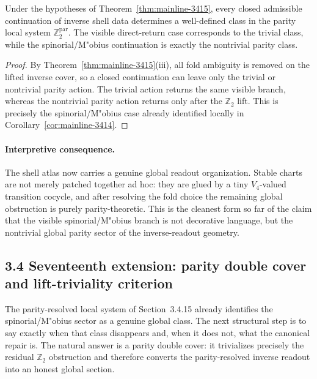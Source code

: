 \begin{corollary}
\label{cor:mainline-3415}
Under the hypotheses of Theorem~\ref{thm:mainline-3415}, every closed admissible continuation of inverse shell data determines a well-defined class in the parity local system $\mathbb Z_2^{\mathrm{par}}$. The visible direct-return case corresponds to the trivial class, while the spinorial/M"obius continuation is exactly the nontrivial parity class.
\end{corollary}

\begin{proof}
By Theorem~\ref{thm:mainline-3415}(iii), all fold ambiguity is removed on the lifted inverse cover, so a closed continuation can leave only the trivial or nontrivial parity action. The trivial action returns the same visible branch, whereas the nontrivial parity action returns only after the $\mathbb Z_2$ lift. This is precisely the spinorial/M"obius case already identified locally in Corollary~\ref{cor:mainline-3414}.
\end{proof}

\paragraph{Interpretive consequence.}
The shell atlas now carries a genuine global readout organization. Stable charts are not merely patched together ad hoc: they are glued by a tiny $V_4$-valued transition cocycle, and after resolving the fold choice the remaining global obstruction is purely parity-theoretic. This is the cleanest form so far of the claim that the visible spinorial/M"obius branch is not decorative language, but the nontrivial global parity sector of the inverse-readout geometry.




\subsection*{3.4 Seventeenth extension: parity double cover and lift-triviality criterion}
The parity-resolved local system of Section~3.4.15 already identifies the spinorial/M"obius sector as a genuine global class. The next structural step is to say exactly when that class disappears and, when it does not, what the canonical repair is. The natural answer is a parity double cover: it trivializes precisely the residual $\mathbb Z_2$ obstruction and therefore converts the parity-resolved inverse readout into an honest global section.


